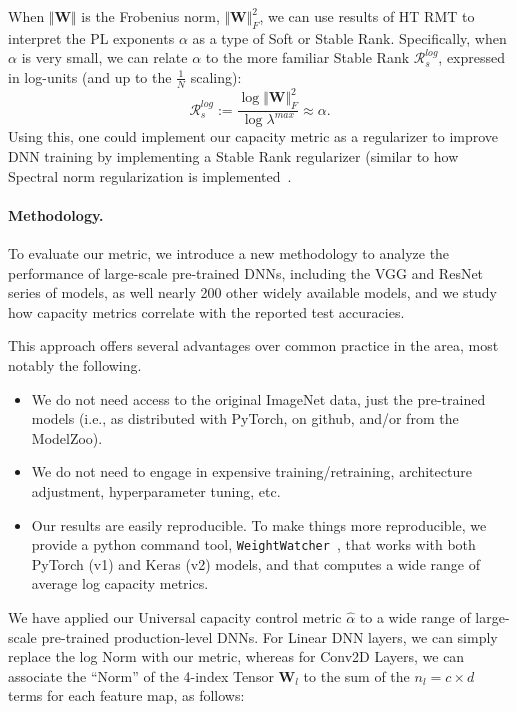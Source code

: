 When $\Vert\mathbf{W}\Vert$ is the Frobenius norm, $\Vert\mathbf{W}\Vert^{2}_{F}$, we can use results of HT RMT to interpret the PL exponents $\alpha$ as a type of Soft or Stable Rank. 
Specifically, when $\alpha$ is very small, we can relate $\alpha$ to the more familiar Stable Rank $\mathcal{R}^{log}_{s}$, expressed in log-units (and up to the $\frac{1}{N}$ scaling):
\begin{equation}
\mathcal{R}^{log}_{s}:=\dfrac{\log\Vert\mathbf{W}\Vert^{2}_{F}}{\log\lambda^{max}}  \approx \alpha  .
\end{equation}
Using this, one could implement our capacity metric as a regularizer to improve DNN training by implementing a Stable Rank regularizer (similar to how Spectral norm regularization is implemented~\cite{XXX-XXX-WHAT-IS-BEST-REF}.


\paragraph{Methodology.} 
To evaluate our metric, we introduce a new methodology to analyze the performance of large-scale pre-trained DNNs, including the VGG and ResNet series of models, as well nearly 200 other widely available models, and we study how capacity metrics correlate with the reported test accuracies.
 
This approach offers several advantages over common practice in the area, most notably the following.
\begin{itemize}
\item 
We do not need access to the original ImageNet data, just the pre-trained models (i.e., as distributed with PyTorch, on github, and/or from the ModelZoo).
\item
We do not need to engage in expensive training/retraining, architecture adjustment, hyperparameter tuning, etc.
\item 
Our results are easily reproducible.
To make things more reproducible, we provide a python command tool, \texttt{WeightWatcher}~\cite{weightwatcher_package_justURL}, that works with both PyTorch (v1) and Keras (v2) models, and that computes a wide range of average log capacity metrics.
\end{itemize}
 
We have applied our Universal capacity control metric $\hat{\alpha}$ to a wide range of large-scale pre-trained production-level DNNs.
For Linear DNN layers, we can simply replace the log Norm with our metric, whereas for Conv2D Layers, we can associate the ``Norm'' of the 4-index Tensor $\mathbf{W}_{l}$ to the sum of the $n_{l}=c\times d$ terms for each feature map, as follows:

